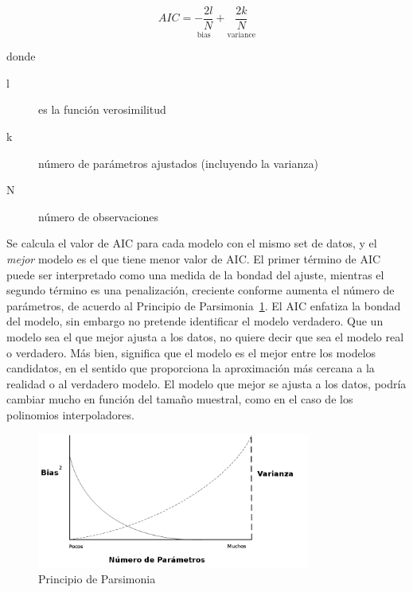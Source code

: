 \begin{equation}
\label{eq:aicformula}
AIC = \underset{\text{bias}}{-\frac{2l}{N}} + 
\underset{\text{variance}}{\frac{2k}{N}}
\end{equation}

\noindent donde

\begin{description}
\item[l] es la función verosimilitud
\item[k] número de parámetros ajustados (incluyendo la varianza)
\item[N] número de observaciones
\end{description}

Se calcula el valor de AIC para cada modelo con el mismo set de datos, y
el \emph{mejor} modelo es el que tiene menor valor de AIC.
El primer término de AIC puede ser interpretado como una medida de la bondad
del ajuste, mientras el segundo término es una penalización, creciente conforme
aumenta el número de parámetros, de acuerdo al Principio de
Parsimonia~\ref{fig:parsimony}. El AIC enfatiza la bondad del modelo, sin
embargo no pretende identificar el modelo verdadero. Que un modelo sea el que
mejor ajusta a los datos, no quiere decir que sea el modelo real o verdadero.
Más bien, significa que el modelo es el mejor entre los modelos candidatos, en
el sentido que proporciona la aproximación más cercana a la realidad o al
verdadero modelo. El modelo que mejor se ajusta a los datos, podría cambiar
mucho en función del tamaño muestral, como en el caso de los polinomios
interpoladores.

\begin{figure}[h!t]
    \begin{center}
        \includegraphics[width=0.8\textwidth]{images/parsimony}
        \caption{Principio de Parsimonia}
        \label{fig:parsimony}
    \end{center}
\end{figure}

